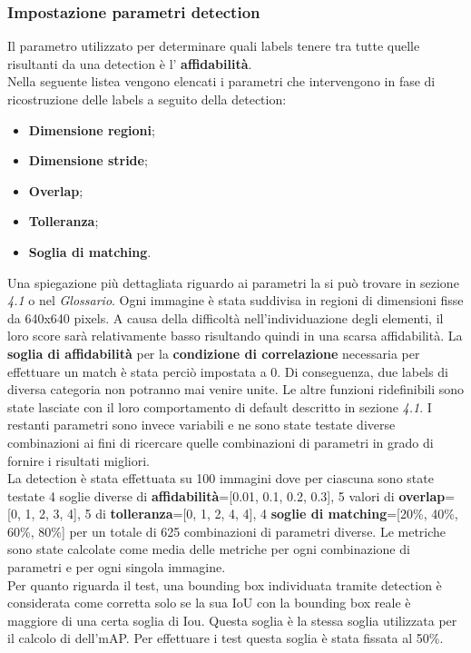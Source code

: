 \subsubsection{Impostazione parametri detection}
Il parametro utilizzato per determinare quali labels tenere tra tutte quelle risultanti da una detection è
l' \textbf{affidabilità}.\\
Nella seguente listea vengono elencati i parametri che intervengono in fase di ricostruzione delle labels a seguito della detection:
\begin{itemize}
\item \textbf{Dimensione regioni};
\item \textbf{Dimensione stride};
\item \textbf{Overlap};
\item \textbf{Tolleranza};
\item \textbf{Soglia di matching}.
\end{itemize}
Una spiegazione più dettagliata riguardo ai parametri la si può trovare in sezione \textit{4.1} o nel \textit{Glossario}.
Ogni immagine è stata suddivisa in regioni di dimensioni fisse da 640x640 pixels. A causa della difficoltà nell'individuazione degli elementi, il loro score sarà relativamente basso risultando quindi in una scarsa affidabilità. La \textbf{soglia di affidabilità} per la \textbf{condizione di correlazione} necessaria per effettuare un match è stata perciò impostata a 0. Di conseguenza, due labels di diversa categoria non potranno mai venire unite. Le altre funzioni ridefinibili sono state lasciate con il loro comportamento di default descritto in sezione \textit{4.1}. I restanti parametri sono invece variabili e ne sono state testate diverse combinazioni ai fini di ricercare quelle combinazioni di parametri in grado di fornire i risultati migliori.
\\
La detection è stata effettuata su 100 immagini dove per ciascuna sono state testate 4 soglie diverse di \textbf{affidabilità}=[0.01, 0.1, 0.2, 0.3], 5 valori di \textbf{overlap}=[0, 1, 2, 3, 4], 5 di \textbf{tolleranza}=[0, 1, 2, 4, 4], 4 \textbf{soglie di matching}=[20\%, 40\%, 60\%, 80\%] per un totale di 625 combinazioni di parametri diverse. Le metriche sono state calcolate come media delle metriche per ogni combinazione di parametri e per ogni singola immagine.\\
Per quanto riguarda il test, una bounding box individuata tramite detection è considerata come corretta solo se la sua IoU con la bounding box reale è maggiore di una certa soglia di Iou. Questa soglia è la stessa soglia utilizzata per il calcolo di dell'mAP. Per effettuare i test questa soglia è stata fissata al 50\%.

